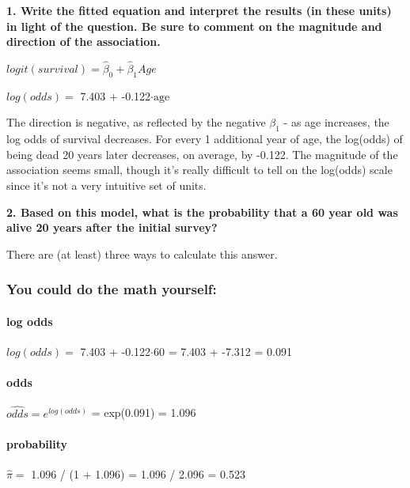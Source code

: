 \documentclass[]{article}
\let\oldparagraph\paragraph
\renewcommand{\paragraph}[1]{\oldparagraph{#1}\mbox{}}
\begin{document}
\textbf{1. Write the fitted equation and interpret the results (in these
units) in light of the question. Be sure to comment on the magnitude and
direction of the association.}

\(logit(survival) = \hat\beta_0 + \hat\beta_1 Age\)

\(log(odds)=\) 7.403 + -0.122\(\cdot \text{age}\)

The direction is negative, as reflected by the negative \(\beta_1\) - as
age increases, the log odds of survival decreases. For every 1
additional year of age, the log(odds) of being dead 20 years later
decreases, on average, by -0.122. The magnitude of the association seems
small, though it's really difficult to tell on the log(odds) scale since
it's not a very intuitive set of units.

\vspace{0.25in}

\textbf{2. Based on this model, what is the probability that a 60 year
old was alive 20 years after the initial survey?}

There are (at least) three ways to calculate this answer.

\hypertarget{you-could-do-the-math-yourself}{%
\subsubsection{You could do the math
yourself:}\label{you-could-do-the-math-yourself}}

\hypertarget{log-odds}{%
\paragraph{log odds}\label{log-odds}}

\(log(odds)=\) 7.403 + -0.122\(\cdot \text{60}\) = 7.403 + -7.312 =
0.091

\hypertarget{odds}{%
\paragraph{odds}\label{odds}}

\(\widehat{odds}= e^{log(odds)}\) = exp(0.091) = 1.096

\hypertarget{probability}{%
\paragraph{probability}\label{probability}}

\(\hat\pi=\) 1.096 / (1 + 1.096) = 1.096 / 2.096 = 0.523
\end{document}
